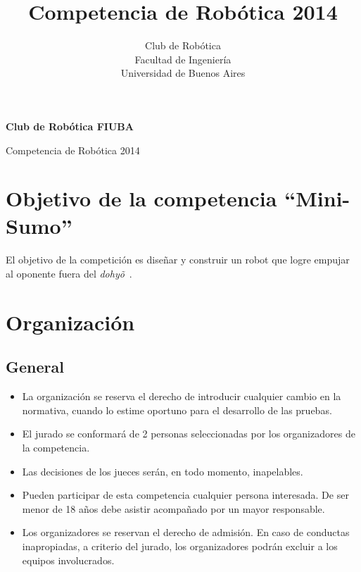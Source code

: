 \documentclass[a4paper,11pt]{article}
\author{Club de Robótica \\ Facultad de Ingeniería \\ Universidad de Buenos Aires}
\title{Competencia de Robótica 2014}
\newcommand{\dojo}{\emph{dohy\~{o}}~}
\begin{document}
\begin{center}
  {\Huge \textbf{Club de Robótica FIUBA}}
  \vspace{0.5cm}

  {\huge Competencia de Robótica 2014}
\end{center}


\section*{Objetivo de la competencia ``Mini-Sumo''}
El objetivo de la competición es diseñar y construir un robot que logre empujar al oponente fuera del \dojo.



\section*{Organización}
\subsection*{General}
\begin{itemize}
  \item La organización se reserva el derecho de introducir cualquier cambio en la normativa, cuando lo estime oportuno para el desarrollo de las pruebas.
  \item El jurado se conformará de 2 personas seleccionadas por los organizadores de la competencia.
  \item Las decisiones de los jueces serán, en todo momento, inapelables.
  \item Pueden participar de esta competencia cualquier persona interesada. De ser menor de 18 años debe asistir acompañado por un mayor responsable.
  \item Los organizadores se reservan el derecho de admisión. En caso de conductas inapropiadas, a criterio del jurado, los organizadores podrán excluir a los equipos involucrados.
\end{itemize}
\end{document}
